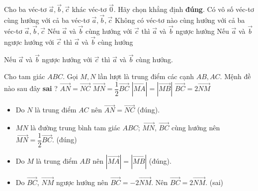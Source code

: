 \begin{ex}%
Cho ba véc-tơ  $\overrightarrow{a},\overrightarrow{b},\overrightarrow{c}$  khác véc-tơ  $\overrightarrow{0}$.  Hãy chọn khẳng định \textbf{đúng}.
\choice
{Có vô số véc-tơ cùng hướng với cả ba véc-tơ  $\overrightarrow{a},\overrightarrow{b},\overrightarrow{c}$}
{Không có véc-tơ nào cùng hướng với cả ba véc-tơ  $\overrightarrow{a},\overrightarrow{b},\overrightarrow{c}$}
{Nếu  $\overrightarrow{a}$  và  $\overrightarrow{b}$  cùng  hướng với  $\overrightarrow{c}$  thì  $\overrightarrow{a}$  và  $\overrightarrow{b}$  ngược hướng}
{\True Nếu  $\overrightarrow{a}$  và  $\overrightarrow{b}$  ngược hướng với  $\overrightarrow{c}$  thì  $\overrightarrow{a}$  và  $\overrightarrow{b}$  cùng hướng}

	\loigiai
	{Nếu  $\overrightarrow{a}$  và  $\overrightarrow{b}$  ngược hướng với  $\overrightarrow{c}$  thì  $\overrightarrow{a}$  và  $\overrightarrow{b}$  cùng hướng.
	}
\end{ex}
\begin{ex}%
 Cho tam giác  $ABC$. Gọi  $M,N$  lần lượt là trung điểm các cạnh  $AB,AC$. Mệnh đề nào sau đây \textbf{sai} ?
\choice
{$\overrightarrow{AN}=\overrightarrow{NC}$}
{$\overrightarrow{MN}=\dfrac{1}{2}\overrightarrow{BC}$}
{$\left| \overrightarrow{MA} \right|=\left| \overrightarrow{MB} \right|$}
{\True  $\overrightarrow{BC}=2\overrightarrow{NM}$}
\loigiai
	{\begin{itemize}
		\item Do $ N $ là trung điểm $ AC $ nên $ \vec{AN} = \vec{NC} $ (đúng).
		\item $ MN $ là đường trung bình tam giác $ ABC $; $ \vec{MN} $, $ \vec{BC} $ cùng hướng nên $ \vec{MN} = \dfrac{1}{2} \vec{BC}. $ (đúng)
		\item Do $ M $ là trung điểm $ AB $ nên $ |\vec{MA}| = |\vec{MB}| $ (đúng).
		\item Do $ \vec{BC} $, $ \vec{NM} $ ngược hướng nên $\overrightarrow{BC}=-2\overrightarrow{NM}.$ Nên $\overrightarrow{BC}=2\overrightarrow{NM}$. (sai)
	\end{itemize}	
	
	}
\end{ex}

